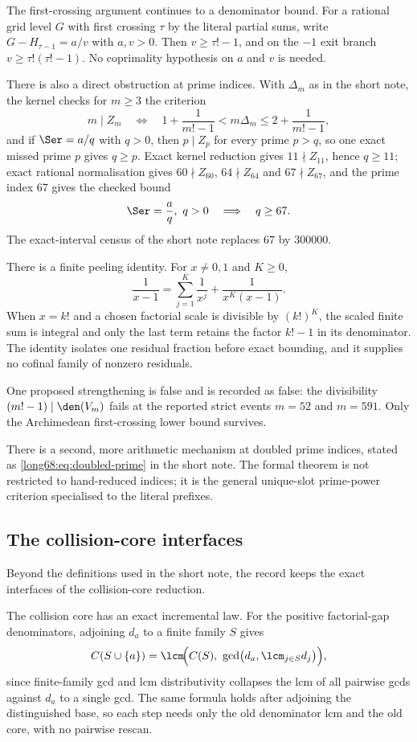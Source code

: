 The first-crossing argument continues to a denominator bound.  For a rational
grid level $G$ with first crossing $\tau$ by the literal partial sums, write
$G-H_{\tau-1}=a/v$ with $a,v>0$.  Then $v\ge\tau!-1$, and on the $-1$ exit
branch $v\ge\tau!(\tau!-1)$.  No coprimality hypothesis on $a$ and $v$ is
needed.

There is also a direct obstruction at prime indices.  With $\Delta_m$ as in
the short note, the kernel checks for $m\ge3$ the criterion
\[
 m\mid Z_m
 \quad\Longleftrightarrow\quad
 1+\frac1{m!-1}<m\Delta_m\le2+\frac1{m!-1},
\]
and if $\Ser=a/q$ with $q>0$, then $p\mid Z_p$ for every prime $p>q$, so one
exact missed prime $p$ gives $q\ge p$.  Exact kernel reduction gives
$11\nmid Z_{11}$, hence $q\ge11$; exact rational normalisation gives
$60\nmid Z_{60}$, $64\nmid Z_{64}$ and $67\nmid Z_{67}$, and the prime index
$67$ gives the checked bound
\[
 \Ser=\frac aq,\ q>0\quad\Longrightarrow\quad q\ge67 .
\]
The exact-interval census of the short note replaces $67$ by $300000$.

There is a finite peeling identity.  For $x\ne0,1$ and $K\ge0$,
\[
 \frac1{x-1}=\sum_{j=1}^{K}\frac1{x^j}+\frac1{x^K(x-1)} .
\]
When $x=k!$ and a chosen factorial scale is divisible by $(k!)^K$, the scaled
finite sum is integral and only the last term retains the factor $k!-1$ in
its denominator.  The identity isolates one residual fraction before exact
bounding, and it supplies no cofinal family of nonzero residuals.

One proposed strengthening is false and is recorded as false: the
divisibility $(m!-1)\mid\den(V_m)$ fails at the reported strict events
$m=52$ and $m=591$.  Only the Archimedean first-crossing lower bound
survives.

There is a second, more arithmetic mechanism at doubled prime indices, stated
as \eqref{long68:eq:doubled-prime} in the short note.  The formal theorem is not
restricted to hand-reduced indices; it is the general unique-slot prime-power
criterion specialised to the literal prefixes.

\subsection{The collision-core interfaces}\label{long68:sec:ext-collision}

Beyond the definitions used in the short note, the record keeps the exact
interfaces of the collision-core reduction.

The collision core has an exact incremental law.  For the positive
factorial-gap denominators, adjoining $d_a$ to a finite family $S$ gives
\[
 C(S\cup\{a\})=\lcm\!\Bigl(C(S),\ \gcd\bigl(d_a,\lcm_{j\in S}d_j\bigr)\Bigr),
\]
since finite-family gcd and lcm distributivity collapses the lcm of all
pairwise gcds against $d_a$ to a single gcd.  The same formula holds after
adjoining the distinguished base, so each step needs only the old denominator
lcm and the old core, with no pairwise rescan.


